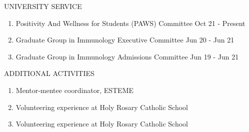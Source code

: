 \documentclass{resume} %
\begin{document}


\begin{rSection}{UNIVERSITY SERVICE}
\begin{enumerate}

\item Positivity And Wellness for Students (PAWS) Committee
\hfill Oct 21 - Present
\item Graduate Group in Immunology Executive Committee
\hfill Jun 20 - Jun 21
\item Graduate Group in Immunology Admissions Committee
\hfill Jun 19 - Jun 21

\end{enumerate}
\end{rSection}

\begin{rSection}{ADDITIONAL ACTIVITIES} \itemsep -3pt
\begin{enumerate}

\item Mentor-mentee coordinator, ESTEME
\item Volunteering experience at Holy Rosary Catholic School
\item Volunteering experience at Holy Rosary Catholic School

\end{enumerate}
\end{rSection}
\end{document}
